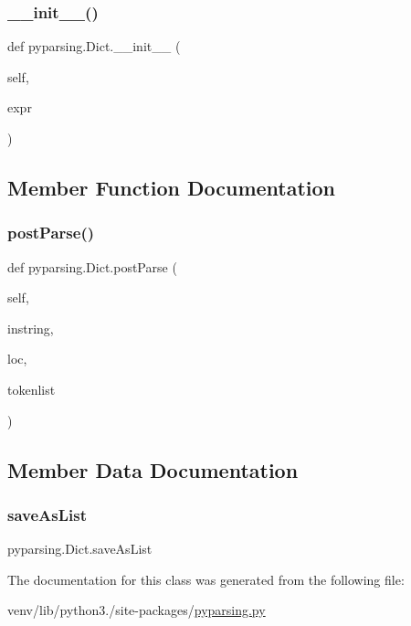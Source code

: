 \subsubsection{\texorpdfstring{\+\_\+\+\_\+init\+\_\+\+\_\+()}{\_\_init\_\_()}}
{\footnotesize\ttfamily def pyparsing.\+Dict.\+\_\+\+\_\+init\+\_\+\+\_\+ (\begin{DoxyParamCaption}\item[{}]{self,  }\item[{}]{expr }\end{DoxyParamCaption})}



\subsection{Member Function Documentation}
\mbox{\label{classpyparsing_1_1Dict_a99c64e2caee00ebeb0fd12abe859180d}} 
\subsubsection{\texorpdfstring{post\+Parse()}{postParse()}}
{\footnotesize\ttfamily def pyparsing.\+Dict.\+post\+Parse (\begin{DoxyParamCaption}\item[{}]{self,  }\item[{}]{instring,  }\item[{}]{loc,  }\item[{}]{tokenlist }\end{DoxyParamCaption})}



\subsection{Member Data Documentation}
\mbox{\label{classpyparsing_1_1Dict_a4165522c7457c3690568e462306f9fdd}} 
\subsubsection{\texorpdfstring{save\+As\+List}{saveAsList}}
{\footnotesize\ttfamily pyparsing.\+Dict.\+save\+As\+List}



The documentation for this class was generated from the following file\+:\begin{DoxyCompactItemize}
\item 
venv/lib/python3./site-\/packages/\hyperlink{pyparsing_8py}{pyparsing.\+py}\end{DoxyCompactItemize}
